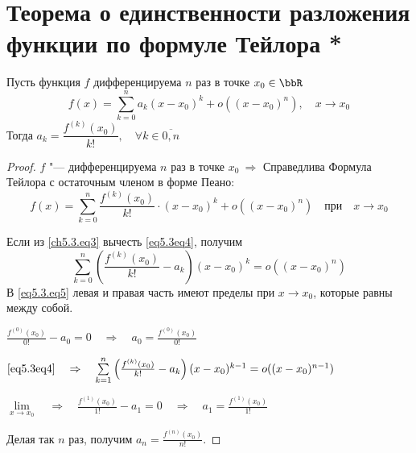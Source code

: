 \section{Теорема о единственности разложения функции по формуле Тейлора *}

\begin{notion}

\begin{thm}

Пусть функция $f$ дифференцируема $n$ раз в точке $x_0 \in \bbR$
\begin{equation} \label{ch5.3.eq3}
f(x) = \sum_{k = 0}^{n}a_k (x - x_0)^k + o((x - x_0)^n), \quad x \to x_0 
\end{equation}
Тогда $a_k = \dfrac{f^{(k)}(x_0)}{k!}, \quad \forall k \in \overline{0, n}$
\end{thm}

\begin{proof}
$f$ "--- дифференцируема $n$ раз в точке $x_0 \ \Rightarrow$
Справедлива Формула Тейлора с остаточным членом в форме Пеано:
\begin{equation} \label{eq5.3eq4}
f(x) = \sum_{k = 0}^{n} \frac{f^{(k)}(x_0)}{k!} \cdot (x - x_0)^k + o((x - x_0)^n) \quad \text{при} \quad x \to x_0
\end{equation}

Если из \eqref{ch5.3.eq3} вычесть \eqref{eq5.3eq4}, получим
\begin{equation} \label{eq5.3.eq5}
\sum\limits_{k = 0}^{n} \left( \frac{f^{(k)}(x_0)}{k!} - a_k \right) (x - x_0)^k = o((x - x_0)^n)
\end{equation}
В \eqref{eq5.3.eq5} левая и правая часть имеют пределы при $x \to x_0$, которые равны между собой.

$\frac{f^{(0)}(x_0)}{0!} - a_0 = 0 \quad \Rightarrow \quad a_0 = \frac{f^{(0)}(x_0)}{0!}$

$\eqref{eq5.3eq4} \quad \Rightarrow \quad \sum\limits_{k = 1}^{n} \left( \frac{f^{(k)}(x_0)}{k!} - a_k \right) (x - x_0)^{k - 1} = o((x - x_0)^{n - 1})$

$\lim\limits_{x \to x_0} \quad \Rightarrow \quad \frac{f^{(1)}(x_0)}{1!} - a_1 = 0 \quad \Rightarrow \quad a_1 = \frac{f^{(1)}(x_0)}{1!}$

Делая так $n$ раз, получим $a_n = \frac{f^{(n)}(x_0)}{n!}$.
\end{proof}

\end{notion}


